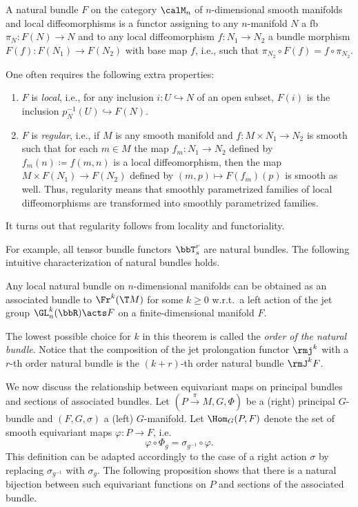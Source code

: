 \begin{defn}\label{def natural bundle}
    A natural bundle $F$ on the category $\calM_n$ of $n$-dimensional smooth manifolds and local diffeomorphisms is a functor assigning to any $n$-manifold $N$ a \gls{fb} $\pi_N:F(N)\to N$ and to any local diffeomorphism $f:N_1\to N_2$ a bundle morphism $F(f):F(N_1)\to F(N_2)$ with base map $f$, i.e., such that $\pi_{N_2}\circ F(f)=f\circ \pi_{N_2}$. 

    One often requires the following extra properties:
    \begin{enumerate}[label=(\alph*)]
        \item $F$ is \emph{local}, i.e., for any inclusion $i:U\hookrightarrow N$ of an open subset, $F(i)$ is the inclusion $p^{-1}_N(U)\hookrightarrow F(N)$.
    
        \item $F$ is \emph{regular}, i.e., if $M$ is any smooth manifold and $f:M\times N_1\to N_2$ is smooth such that for each $m\in M$ the map $f_m:N_1\to N_2$ defined by $f_m(n)\coloneqq f(m,n)$ is a local diffeomorphism, then the map $M\times F(N_1)\to F(N_2)$ defined by $(m,p)\mapsto F(f_m)(p)$ is smooth as well. Thus, regularity means that smoothly parametrized families of local diffeomorphisms are transformed into smoothly parametrized families.
    \end{enumerate}
    It turns out that regularity follows from locality and functoriality.
\end{defn}

For example, all tensor bundle functors $\bbT^r_s$ are natural bundles. The following intuitive characterization of natural bundles holds.

\begin{thm}
    Any local natural bundle on $n$-dimensional manifolds can be obtained as an associated bundle to $\Fr^k (\T M)$ for some $k\geq 0$ w.r.t.\ a left action of the jet group $\GL^k_n(\bbR)\acts F$ on a finite-dimensional manifold $F$.
\end{thm}

The lowest possible choice for $k$ in this theorem is called the \emph{order of the natural bundle}. Notice that the composition of the jet prolongation functor $\rmj^k$ with a $r$-th order natural bundle is the $(k+r)$-th order natural bundle $\rmJ^k F$.




We now discuss the relationship between equivariant maps on principal bundles and sections of associated bundles. Let $(P\overset{\pi}{\to}M,G,\Phi)$ be a (right) principal $G$-bundle and $(F,G,\sigma)$ a (left) $G$-manifold. Let $\Hom_G(P,F)$ denote the set of smooth equivariant maps $\varphi:P\to F$, i.e.
\[\varphi\circ \Phi_g=\sigma_{g^{-1}}\circ \varphi.\label{eq 1.2.9 RS2}\]
This definition can be adapted accordingly to the case of a right action $\sigma$ by replacing $\sigma_{g^{-1}}$ with $\sigma_g$. The following proposition shows that there is a natural bijection between such equivariant functions on $P$ and sections of the associated bundle.

